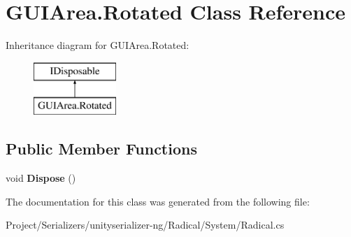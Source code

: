 \hypertarget{class_g_u_i_area_1_1_rotated}{}\section{G\+U\+I\+Area.\+Rotated Class Reference}
\label{class_g_u_i_area_1_1_rotated}
Inheritance diagram for G\+U\+I\+Area.\+Rotated\+:\begin{figure}[H]
\begin{center}
\leavevmode
\includegraphics[height=2.000000cm]{class_g_u_i_area_1_1_rotated}
\end{center}
\end{figure}
\subsection*{Public Member Functions}
\begin{DoxyCompactItemize}
\item 
\mbox{\label{class_g_u_i_area_1_1_rotated_af137ea603de7ba13455a900b95670d2b}} 
void {\bfseries Dispose} ()
\end{DoxyCompactItemize}


The documentation for this class was generated from the following file\+:\begin{DoxyCompactItemize}
\item 
Project/\+Serializers/unityserializer-\/ng/\+Radical/\+System/Radical.\+cs\end{DoxyCompactItemize}
